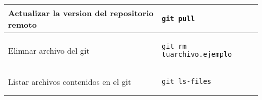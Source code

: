 \documentclass[landscape]{article}
\begin{document}
\begin{table}[ht]
\begin{center}
\begin{tabular}{| l | l |}
Actualizar la version del repositorio remoto &
\begin{lstlisting}
git pull 
\end{lstlisting}\\ \hline

Elimnar archivo del git &
\begin{lstlisting}
git rm tuarchivo.ejemplo
\end{lstlisting}\\ \hline

Listar archivos contenidos en el git &
\begin{lstlisting}
git ls-files
\end{lstlisting}\\ \hline

\end{tabular}
\end{center}
\end{table}
\end{document}
